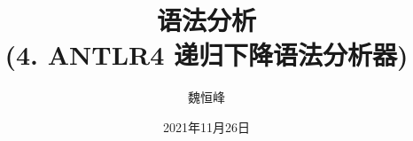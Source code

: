 \documentclass[]{beamer}
\title[语法分析]{语法分析 \\ (4. ANTLR4 递归下降语法分析器)}
\author[魏恒峰]{\large 魏恒峰}
\institute{hfwei@nju.edu.cn}
\date{2021年11月26日}
\begin{document}
\maketitle




\thankyou{}

\end{document}
